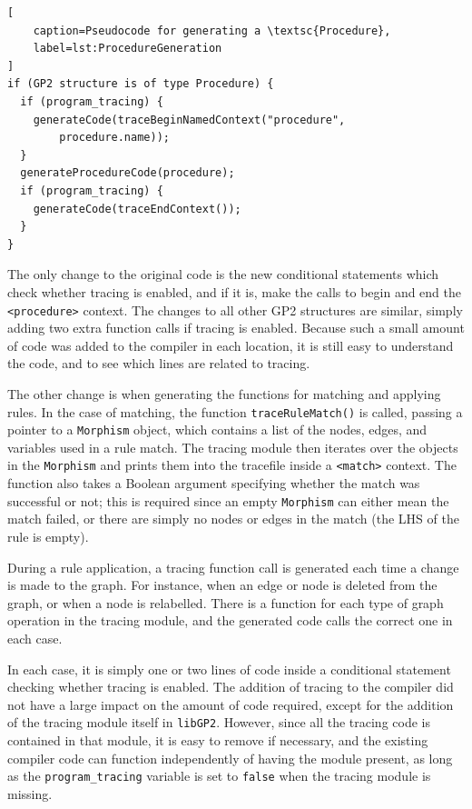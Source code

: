 \documentclass[authoryearcitations]{UoYCSproject}
\begin{document}
\begin{lstlisting}[
    caption=Pseudocode for generating a \textsc{Procedure},
    label=lst:ProcedureGeneration
]
if (GP2 structure is of type Procedure) {
  if (program_tracing) {
    generateCode(traceBeginNamedContext("procedure",
        procedure.name));
  }
  generateProcedureCode(procedure);
  if (program_tracing) {
    generateCode(traceEndContext());
  }
}
\end{lstlisting}
 
The only change to the original code is the new conditional statements which
check whether tracing is enabled, and if it is, make the calls to begin and end
the \texttt{<procedure>} context. The changes to all other GP2 structures are
similar, simply adding two extra function calls if tracing is enabled. Because
such a small amount of code was added to the compiler in each location, it is
still easy to understand the code, and to see which lines are related to tracing.

The other change is when generating the functions for matching and applying rules.
In the case of matching, the  function \texttt{traceRuleMatch()} is called,
passing a pointer to a \texttt{Morphism} object, which contains a list of the
nodes, edges, and variables used in a rule match. The tracing module then 
iterates over the objects in the \texttt{Morphism} and prints them into the
tracefile inside a \texttt{<match>} context. The function also takes a Boolean
argument specifying whether the match was successful or not; this is required
since an empty \texttt{Morphism} can either mean the match failed, or there are
simply no nodes or edges in the match (the LHS of the rule is empty).

During a rule application, a tracing function call is generated each time a
change is made to the graph. For instance, when an edge or node is deleted from
the graph, or when a node is relabelled. There is a function for each type of
graph operation in the tracing module, and the generated code calls the correct
one in each case.

In each case, it is simply one or two lines of code inside a conditional
statement checking whether tracing is enabled. The addition of tracing to the
compiler did not have a large impact on the amount of code required, except for
the addition of the tracing module itself in \texttt{libGP2}. However, since all
the tracing code is contained in that module, it is easy to remove if necessary,
and the existing compiler code can function independently of having the module
present, as long as the \texttt{program\_tracing} variable is set to \texttt{false}
when the tracing module is missing.
\end{document}
